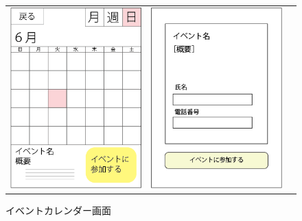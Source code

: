 \newpage
\begin{figure}[h]
    \begin{tabular}{ccc}
      \begin{minipage}[t]{0.33\hsize}
        \centering
        \includegraphics[keepaspectratio, scale=0.4]{process_figures/calender.png}
        \caption{イベントカレンダー画面}
        \label{calender}
      \end{minipage} &
      \begin{minipage}[t]{0.33\hsize}
        \centering
        \includegraphics[keepaspectratio, scale=0.4]{process_figures/joinform.png}

\end{minipage}
\end{tabular}
\end{figure}
